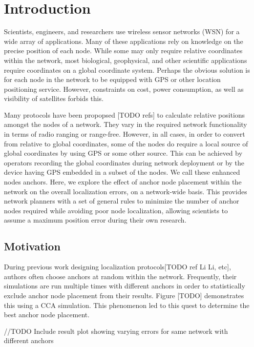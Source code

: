 \chapter{Introduction}

Scientists, engineers, and researchers use wireless sensor networks (WSN) for a wide array of applications. Many of these applications rely on knowledge on the precise position of each node. While some may only require relative coordinates within the network, most biological, geophysical, and other scientific applications require coordinates on a global coordinate system. Perhaps the obvious solution is for each node in the network to be equipped with GPS or other location positioning service.  However, constraints on cost, power consumption, as well as visibility of satellites forbids this.  

Many protocols have been propopsed [TODO refs] to calculate relative positions amongst the nodes of a network.  They vary in the required network functionality in terms of radio ranging or range-free.  However, in all cases, in order to convert from relative to global coordinates, some of the nodes do require a local source of global coordinates by using GPS or some other source.  This can be achieved by operators recording the global coordinates during network deployment or by the device having GPS embedded in a subset of the nodes.  We call these enhanced nodes anchors.  Here, we explore the effect of anchor node placement within the network on the overall localization errors, on a network-wide basis. This provides network planners with a set of general rules to minimize the number of anchor nodes required while avoiding poor node localization, allowing scientists to assume a maximum position error during their own research.

\section{Motivation} 
During previous work designing localization protocols[TODO ref Li Li, etc], authors often choose anchors at random within the network.  Frequently, their simulations are run multiple times with different anchors in order to statistically exclude anchor node placement from their results. Figure [TODO] demonstrates this using a CCA simulation.  This phenomenon led to this quest to determine the best anchor node placement.

//TODO Include result plot showing varying errors for same network with different anchors

